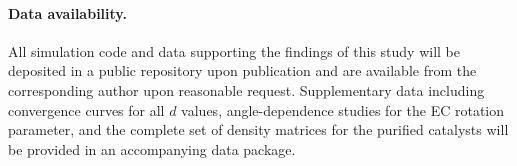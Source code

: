 \documentclass[prx,twocolumn,superscriptaddress,longbibliography,floatfix]{revtex4-2}
\begin{document}
\paragraph*{Data availability.}
All simulation code and data supporting the findings of this study
will be deposited in a public repository upon publication and are
available from the corresponding author upon reasonable request.
Supplementary data including convergence curves for all $d$ values, angle-dependence studies for the EC rotation parameter, and the complete set of density matrices for the purified catalysts will be provided in an accompanying data package.



\end{document}
